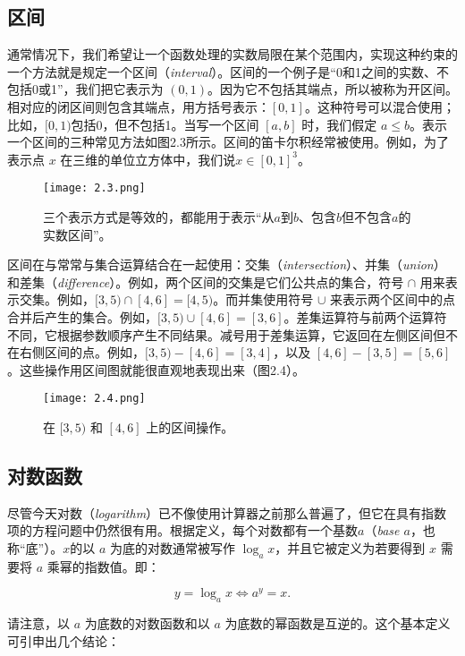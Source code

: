\documentclass[lang=cn,12pt]{elegantbook}
\begin{document}
\subsection{区间}

通常情况下，我们希望让一个函数处理的实数局限在某个范围内，实现这种约束的一个方法就是规定一个区间（\textit{interval}）。区间的一个例子是“0和1之间的实数、不包括0或1”，我们把它表示为 $(0,1)$。因为它不包括其端点，所以被称为开区间。相对应的闭区间则包含其端点，用方括号表示：$[0,1]$。这种符号可以混合使用；比如，$[0,1)$包括0，但不包括1。当写一个区间 $[a,b]$ 时，我们假定 $a \leq b$。表示一个区间的三种常见方法如图2.3所示。区间的笛卡尔积经常被使用。例如，为了表示点 $x$ 在三维的单位立方体中，我们说$x \in [0, 1]^3$。

\begin{figure}[htbp]
  \centering
  \texttt{[image: 2.3.png]}
  \caption{三个表示方式是等效的，都能用于表示“从$a$到$b$、包含$b$但不包含$a$的实数区间”。}
\end{figure}

区间在与常常与集合运算结合在一起使用：交集（\textit{intersection}）、并集（\textit{union}）和差集（\textit{difference}）。例如，两个区间的交集是它们公共点的集合，符号 $\cap$ 用来表示交集。例如，$[3,5) \cap [4,6] = [4,5)$。而并集使用符号 $\cup$ 来表示两个区间中的点合并后产生的集合。例如，$[3,5) \cup [4,6] = [3,6]$。差集运算符与前两个运算符不同，它根据参数顺序产生不同结果。减号用于差集运算，它返回在左侧区间但不在右侧区间的点。例如，$[3,5) - [4,6] = [3,4]$，以及 $[4,6] - [3,5] = [5,6]$。这些操作用区间图就能很直观地表现出来（图2.4）。

\begin{figure}[htbp]
  \centering
  \texttt{[image: 2.4.png]}
  \caption{在 $[3,5)$ 和 $[4,6]$ 上的区间操作。}
\end{figure}

\subsection{对数函数}

尽管今天对数（\textit{logarithm}）已不像使用计算器之前那么普遍了，但它在具有指数项的方程问题中仍然很有用。根据定义，每个对数都有一个基数$a$（\textit{base $a$}，也称“底”）。$x$的以 $a$ 为底的对数通常被写作 $\log_ax$，并且它被定义为若要得到 $x$ 需要将 $a$ 乘幂的指数值。即：

$$
  y = \log_ax \iff a^y = x.
$$

请注意，以 $a$ 为底数的对数函数和以 $a$ 为底数的幂函数是互逆的。这个基本定义可引申出几个结论：
\end{document}
